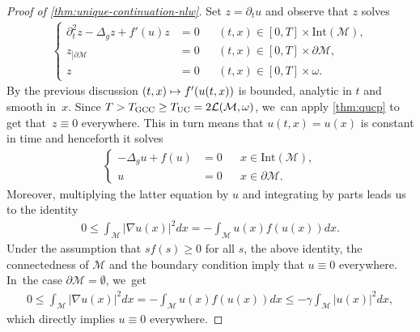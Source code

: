 \documentclass[JEP,XML,SOM,Unicode,published]{cedram}
\newcommand\mto{\mathchoice{\longmapsto}{\mapsto}{\mapsto}{\mapsto}}
\theoremstyle{definition}
\let\mc\mathcal
\newcommand{\M}{\mc{M}}
\begin{document}
\begin{proof}[Proof of \cref{thm:unique-continuation-nlw}]
Set $z=\partial_t u$ and observe that $z$ solves
\begin{align}\label{thm:proof:eq:nlw-unique-cont}
\left\{\begin{aligned}
\partial_t^2 z-\Delta_g z+f'(u)z&=0 &&(t, x)\in [0, T]\times \text{Int}(\M),\\
z_{\left|\partial\M\right.}&=0 &&(t, x)\in [0, T]\times\partial\M,\\
z&=0 &&(t, x)\in [0, T]\times \omega.
\end{aligned}\right.
\end{align}
By the previous discussion $(t, x)\mto f'(u(t, x))$ is bounded, analytic in $t$ and smooth in~$x$. Since $T>T_{\textup{GCC}}\geq T_{\textup{UC}}=2\mc{L}(\M, \omega)$, we~can apply \cref{thm:qucp} to get that~$z\equiv 0$ everywhere. This in turn means that $u(t, x)=u(x)$ is constant in time and henceforth it solves
\begin{align}
\left\{\begin{aligned}
-\Delta_g u+f(u)&=0 &&x\in\text{Int}(\M),\\
u&=0 &&x\in \partial\M.
\end{aligned}\right.
\end{align}
Moreover, multiplying the latter equation by $u$ and integrating by parts leads us to the identity
\begin{align*}
0\leq \int_\M |\nabla u(x)|^2 dx=-\int_\M u(x)f(u(x)) dx.
\end{align*}
Under the assumption that $sf(s)\geq 0$ for all $s$, the above identity, the connectedness of $\M$ and the boundary condition imply that $u\equiv 0$ everywhere. In~the case $\partial\M=\emptyset$, we~get
\begin{align*}
0\leq \int_\M |\nabla u(x)|^2 dx=-\int_\M u(x)f(u(x)) dx\leq -\gamma\int_\M |u(x)|^2dx,
\end{align*}
which directly implies $u\equiv 0$ everywhere.
\end{proof}
\end{document}
